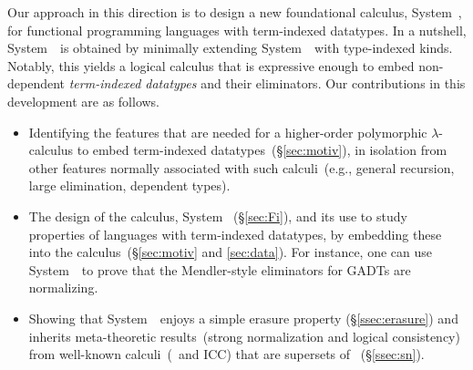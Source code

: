 Our approach in this direction is to design a new foundational calculus,
System~\Fi, for functional programming languages with term-indexed
datatypes.  In a nutshell, System~\Fi\ is obtained by minimally extending
System~\Fw\ with type-indexed kinds.  Notably, this yields a logical
calculus that is expressive enough to embed non-dependent
\emph{term-indexed datatypes} and their eliminators. Our contributions in
this development are as follows.\vspace*{-.8ex}
\begin{itemize}
\item 
  Identifying the features that are needed for a higher-order polymorphic
  $\lambda$-calculus to embed term-indexed datatypes~(\S\ref{sec:motiv}),
  in isolation from other features normally associated with such
  calculi~(e.g., general recursion, large elimination, dependent types).
\item 
  The design of the calculus, System \Fi\ (\S\ref{sec:Fi}), and its use to
  study properties of languages with term-indexed datatypes, by embedding
  these into the calculus~(\S\ref{sec:motiv} and \ref{sec:data}).
  For instance, one can use System~\Fi\ to prove that
  the Mendler-style eliminators for GADTs
  \cite{AhnShe11} are normalizing.
\item 
  Showing that System~\Fi\ enjoys a simple erasure
  property (\S\ref{ssec:erasure}) 
  and inherits meta-theoretic
  results~(strong normalization and logical consistency) from well-known
  calculi~(\Fw\ and ICC) that are supersets of \Fi~(\S\ref{ssec:sn}).
\end{itemize}\vspace*{-3pt}

